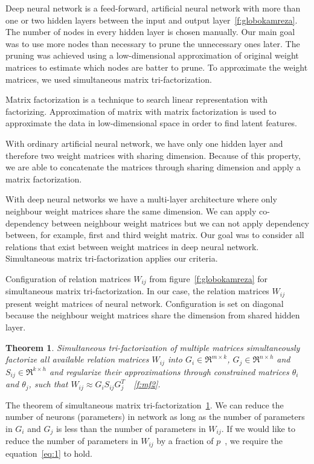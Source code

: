 \documentclass{article} %
\newtheorem{theorem}{Theorem}[section]
\begin{document}
Deep neural network is a feed-forward, artificial neural network with more than
one or two hidden layers between the input and output
layer~\ref{f:globokamreza}. The number of nodes in every hidden layer is chosen
manually. Our main goal was to use more nodes than necessary to prune the
unnecessary ones later. The pruning was achieved using a low-dimensional
approximation of original weight matrices to estimate which nodes are batter to
prune. To approximate the weight matrices, we used simultaneous matrix
tri-factorization.

Matrix factorization is a technique to search linear representation with
factorizing. Approximation of matrix with matrix factorization is used to
approximate the data in low-dimensional space in order to find latent features.

With ordinary artificial neural network, we have only one hidden layer and
therefore two weight matrices with sharing dimension. Because of this property,
we are able to concatenate the matrices through sharing dimension and apply a
matrix factorization.

With deep neural networks we have a multi-layer architecture where only
neighbour weight matrices share the same dimension. We can apply co-dependency
between neighbour weight matrices but we can not apply dependency between, for
example, first and third weight matrix. Our goal was to consider all relations
that exist between weight matrices in deep neural network. Simultaneous matrix
tri-factorization applies our criteria.

Configuration of relation matrices $W_{ij}$ from figure~\ref{f:globokamreza}
for simultaneous matrix tri-factorization. In our case, the relation matrices
$W_{ij}$ present weight matrices of neural network. Configuration is set on
diagonal because the neighbour weight matrices share the dimension from shared
hidden layer.

\begin{theorem}\label{t:2}
Simultaneous tri-factorization of multiple matrices simultaneously 
factorize all available relation matrices $W_{ij}$ into $G_i \in \Re^{m \times 
k}$, $G_j \in \Re^{n \times h}$ and $S_{ij} \in \Re^{k \times h}$ and regularize 
their approximations through constrained matrices $\theta_i$ and $\theta_j$, 
such that $W_{ij} \approx G_iS_{ij}G_j^T$~\cite{zitnik2015data}~\ref{f:mf2}.
\end{theorem} 

The theorem of simultaneous matrix tri-factorization~\ref{t:2}. We can reduce
the number of neurons (parameters) in network as long as the number of parameters
in $G_i$ and $G_j$ is less than the number of parameters in $W_{ij}$. If we would
like to reduce the number of parameters in $W_{ij}$ by a fraction of
$p$~\cite{sainath2013low}, we require the equation~\ref{eq:1} to hold.
\end{document}
